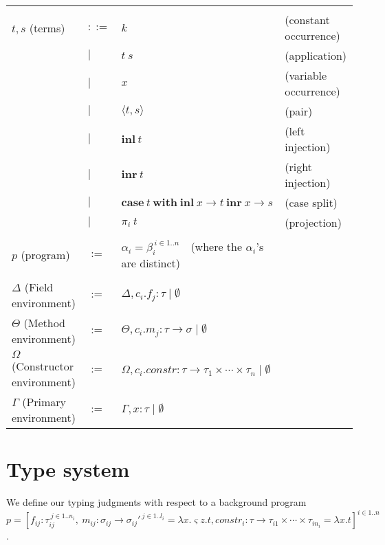 \documentclass{article}
\newcommand{\mbf}{\mathbf}
\begin{document}
\begin{tabular}{llll}
 & & & \\

$t,s$ (terms) & $::=$  & $\mathit{k}$ & (constant occurrence) \\
              & $\mid$ & $\mathit{t~s}$ & (application) \\
              & $\mid$ & $x$ & (variable occurrence) \\ 
              & $\mid$ & $\langle t, s \rangle$ & (pair) \\
              & $\mid$ & $\mbf{inl}~t$ & (left injection) \\
              & $\mid$ & $\mbf{inr}~t$ & (right injection) \\
              & $\mid$ & $\mbf{case}~t~\mbf{with}~\mbf{inl}~x \to t~\mbf{inr}~x \to s$ & (case split) \\
              & $\mid$ & $\pi_i~t$ & (projection) \\
 & & & \\
$p$ (program) & $:=$ & $\alpha_i = \beta_i^{~i \in 1..n}$~~(where the $\alpha_i$'s are distinct) & \\
\if 0
 & & & \\
$\Delta$ (Field environment) & $:=$ & $\Delta,c_i.f_j : \tau \mid \emptyset$ & \\
$\Theta$ (Method environment) & $:=$ & $\Theta,c_i.m_j : \tau \to \sigma \mid \emptyset$ & \\
$\Omega$ (Constructor environment) & $:=$ & $\Omega,c_i.\mathit{constr} : \tau \to \tau_1 \times \cdots \times \tau_n \mid \emptyset$ & \\
\fi
$\Gamma$ (Primary environment) & $:=$ & $\Gamma,x:\tau \mid \emptyset$ & 
\end{tabular}

\section{Type system}

We define our typing judgments with respect to a background program $p = [f_{ij} : \tau_{ij}^{~j \in 1..n_i},~m_{ij} : \sigma_{ij} \to \sigma_{ij}'^{~j \in 1..l_i} = \lambda x. \varsigma z. t, \mathit{constr}_i : \tau \to \tau_{i1} \times \cdots \times \tau_{in_i} = \lambda x.t]^{i \in 1..n}$.
\end{document}
